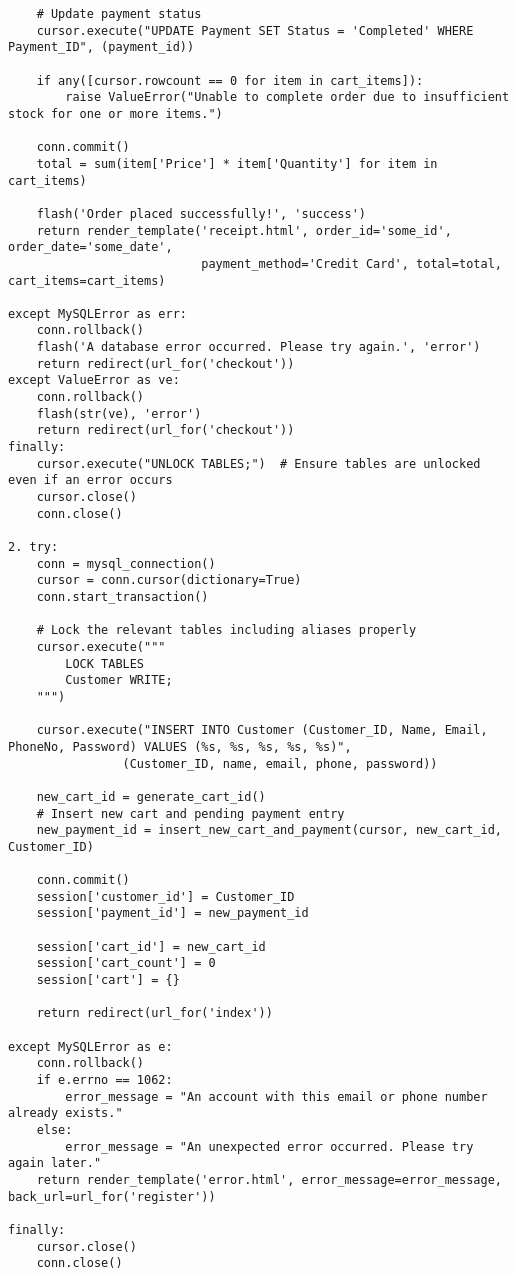 \documentclass[12pt]{article}
\begin{document}
\begin{verbatim}
    # Update payment status
    cursor.execute("UPDATE Payment SET Status = 'Completed' WHERE Payment_ID", (payment_id))

    if any([cursor.rowcount == 0 for item in cart_items]):
        raise ValueError("Unable to complete order due to insufficient stock for one or more items.")

    conn.commit()
    total = sum(item['Price'] * item['Quantity'] for item in cart_items)

    flash('Order placed successfully!', 'success')
    return render_template('receipt.html', order_id='some_id', order_date='some_date',
                           payment_method='Credit Card', total=total, cart_items=cart_items)

except MySQLError as err:
    conn.rollback()
    flash('A database error occurred. Please try again.', 'error')
    return redirect(url_for('checkout'))
except ValueError as ve:
    conn.rollback()
    flash(str(ve), 'error')
    return redirect(url_for('checkout'))
finally:
    cursor.execute("UNLOCK TABLES;")  # Ensure tables are unlocked even if an error occurs
    cursor.close()
    conn.close()

2. try:
    conn = mysql_connection()
    cursor = conn.cursor(dictionary=True)
    conn.start_transaction()
    
    # Lock the relevant tables including aliases properly
    cursor.execute("""
        LOCK TABLES 
        Customer WRITE;
    """)
    
    cursor.execute("INSERT INTO Customer (Customer_ID, Name, Email, PhoneNo, Password) VALUES (%s, %s, %s, %s, %s)",
                (Customer_ID, name, email, phone, password))
    
    new_cart_id = generate_cart_id()
    # Insert new cart and pending payment entry
    new_payment_id = insert_new_cart_and_payment(cursor, new_cart_id, Customer_ID)
    
    conn.commit()
    session['customer_id'] = Customer_ID
    session['payment_id'] = new_payment_id
    
    session['cart_id'] = new_cart_id
    session['cart_count'] = 0
    session['cart'] = {}
    
    return redirect(url_for('index'))

except MySQLError as e:
    conn.rollback()
    if e.errno == 1062:
        error_message = "An account with this email or phone number already exists."
    else:
        error_message = "An unexpected error occurred. Please try again later."
    return render_template('error.html', error_message=error_message, back_url=url_for('register'))

finally:
    cursor.close()
    conn.close()

\end{verbatim}
\end{document}
